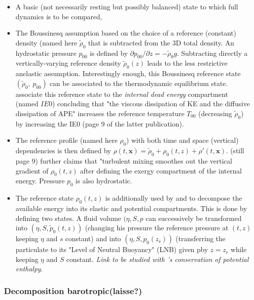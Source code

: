 \begin{itemize}
	\item A basic (not necessarily resting but possibly balanced) state to which full dynamics is to be compared,
	\item The Boussinesq assumption based on the choice of a reference (constant) density (named here $\tilde{\rho}_{0}$ that is subtracted from the 3D total density. An hydrostatic pressure $p_{00}$ is defined by $\partial p_{00}/ \partial z=-\tilde{\rho}_{0} g$. Subtracting directly a vertically-varying reference density $\tilde{\rho}_{0}(z)$ leads to the less restrictive anelastic assumption. Interestingly enough, this Boussinesq reference state $(\tilde{\rho}_{0},\ p_{00})$ can be associated to the thermodynamic equilibrium state. \cite{tailleux_energetics_2009,tailleux_thermodynamicsdynamics_2012} associate this reference state to the \textit{internal dead energy} compartment (named $IE0$) concluding that "the viscous dissipation of KE and the diffusive dissipation of APE" increases the reference temperature $T_{00}$ (decreasing $\tilde{\rho}_{0}$) by increasing the IE0 (page 9 of the latter publication).
	\item The reference profile (named here $\rho_0$) with both time and space (vertical) dependencies is then defined by $\rho(t,\mathbf{x})=\tilde{\rho}_{0}+\rho_0(t,z)+\rho'(t,\mathbf{x})$.  \cite{tailleux_thermodynamicsdynamics_2012} (still page 9) further claims that "turbulent mixing smoothes out the vertical gradient of $\rho_0(t,z)$ after defining the exergy compartment of the internal energy. Pressure $p_0$ is also hydrostatic.
	\item The reference state $\rho_0(t,z)$ is additionally used by \citep{andrews_note_1981} and \citep{tailleux_local_2018} to decompose the available energy into its elastic and potential compartments. This is done by defining two states. A fluid volume $(\eta,S,p$ can successively be transformed into $(\eta,S,\tilde{p}_0(t,z))$ (changing his pressure the reference pressure at $(t,z)$ keeping $\eta$ and $s$ constant) and into $(\eta,S,p_0(z_r))$ (transferring the particulate to its "Level of Neutral Buoyancy" (LNB) given pby $z=z_r$ while keeping $\eta$ and $S$ constant. \textit{Link to be studied with \cite{mcdougall_potential_2003}'s conservation of potential enthalpy}.
\end{itemize}



 \subsubsection{Decomposition barotropic(laisse?)}
 

